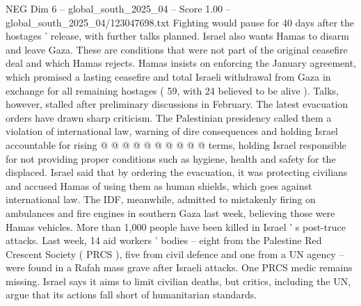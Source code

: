 \begin{textsample}{NEG Dim 6 – global\_south\_2025\_04 – Score 1.00 – global\_south\_2025\_04/123047698.txt}
Fighting would pause for 40 days after the hostages ' release, with further talks planned.
Israel also wants Hamas to disarm and leave Gaza.
These are conditions that were not part of the original ceasefire deal and which Hamas rejects.
Hamas insists on enforcing the January agreement, which promised a lasting ceasefire and total Israeli withdrawal from Gaza in exchange for all remaining hostages ( 59, with 24 believed to be alive ).
Talks, however, stalled after preliminary discussions in February.
The latest evacuation orders have drawn sharp criticism.
The Palestinian presidency called them a violation of international law, warning of dire consequences and holding Israel accountable for rising @ @ @ @ @ @ @ @ @ @ terms, holding Israel responsible for not providing proper conditions such as hygiene, health and safety for the displaced.
Israel said that by ordering the evacuation, it was protecting civilians and accused Hamas of using them as human shields, which goes against international law.
The IDF, meanwhile, admitted to mistakenly firing on ambulances and fire engines in southern Gaza last week, believing those were Hamas vehicles.
More than 1,000 people have been killed in Israel ' s post-truce attacks.
Last week, 14 aid workers ' bodies -- eight from the Palestine Red Crescent Society ( PRCS ), five from civil defence and one from a UN agency -- were found in a Rafah mass grave after Israeli attacks.
One PRCS medic remains missing.
Israel says it aims to limit civilian deaths, but critics, including the UN, argue that its actions fall short of humanitarian standards.

\end{textsample}
